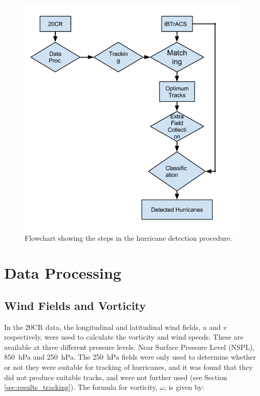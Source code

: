 \documentclass[pdftex,12pt,a4paper]{report}
\begin{document}
\begin{figure}[hbp]
    \centering
    \includegraphics[width=\textwidth]{figures/hurricane_detection_procedure}
    \caption{Flowchart showing the steps in the hurricane detection procedure.}
    \label{fig:hurricane_detection_proc}
\end{figure}

\section{Data Processing}

\subsection{Wind Fields and Vorticity}

In the 20CR data, the longitudinal and latitudinal wind fields, $u$ and $v$ respectively, were used
to calculate the vorticity and wind speeds. These are available at three different pressure levels:
Near Surface Pressure Level (NSPL), \SI{850}{hPa} and \SI{250}{hPa}. The \SI{250}{hPa} fields were
only used to determine whether or not they were suitable for tracking of hurricanes, and it was
found that they did not produce suitable tracks, and were not further used (see Section
\ref{sec:results_tracking}). The formula for vorticity, $\omega$, is given by:
\end{document}
